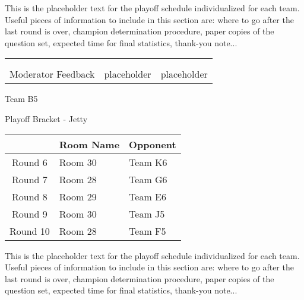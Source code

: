 \documentclass{article}%
\begin{document}
\vspace*{30pt}%
\linebreak%
This is the placeholder text for the playoff schedule individualized for each team. Useful pieces of information to include in this section are: where to go after the last round is over, champion determination procedure, paper copies of the question set, expected time for final statistics, thank{-}you note...%
\vspace*{30pt}%
\newline%
%
\begin{tabularx}{\textwidth}{YYY}%
  &  &  \\%
\\%
Moderator Feedback&placeholder&placeholder\\%
\end{tabularx}%
\newpage%
\begin{center}%
\begin{Huge}%
Team B5%
\end{Huge}%
\vspace*{12pt}%
\linebreak%
\begin{Large}%
Playoff Bracket {-} Jetty%
\end{Large}%
\end{center}%
\vspace*{4pt}%
%
\begin{tabularx}{\textwidth}{|c|Y|Y|}%
\hline%
&Room Name&Opponent\\%
\hline%
Round 6&Room 30&Team K6\\%
Round 7&Room 28&Team G6\\%
Round 8&Room 29&Team E6\\%
Round 9&Room 30&Team J5\\%
Round 10&Room 28&Team F5\\%
\hline%
\end{tabularx}%
\vspace*{30pt}%
\linebreak%
This is the placeholder text for the playoff schedule individualized for each team. Useful pieces of information to include in this section are: where to go after the last round is over, champion determination procedure, paper copies of the question set, expected time for final statistics, thank{-}you note...%
\vspace*{30pt}%
\end{document}
